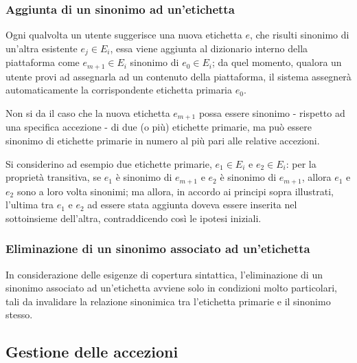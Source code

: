 \documentclass[10pt,a4paper,headinclude,footinclude,hidelinks]{scrreprt} %
\begin{document}

	\subsubsection{Aggiunta di un sinonimo ad un'etichetta}
	Ogni qualvolta un utente suggerisce una nuova etichetta $e$, che risulti sinonimo di un'altra esistente $e_j \in E_i$, essa viene aggiunta al dizionario interno della piattaforma come $e_{m+1} \in E_i$ sinonimo di $e_0 \in E_i$; da quel momento, qualora un utente provi ad assegnarla ad un contenuto della piattaforma, il sistema assegnerà automaticamente la corrispondente etichetta primaria $e_0$.

	Non si da il caso che la nuova etichetta $e_{m+1}$ possa essere sinonimo - rispetto ad una specifica accezione - di due (o più) etichette primarie, ma può essere sinonimo di etichette primarie in numero al più pari alle relative accezioni.

	Si considerino ad esempio due etichette primarie, $e_1 \in E_i$ e $e_2 \in E_i$: per la proprietà transitiva, se $e_1$ è sinonimo di $e_{m+1}$ e $e_2$ è sinonimo di $e_{m+1}$, allora $e_1$ e $e_2$ sono a loro volta sinonimi; ma allora, in accordo ai principi sopra illustrati, l'ultima tra $e_1$ e $e_2$ ad essere stata aggiunta doveva essere inserita nel sottoinsieme dell'altra, contraddicendo così le ipotesi iniziali.

	\subsubsection{Eliminazione di un sinonimo associato ad un'etichetta}
	In considerazione delle esigenze di copertura sintattica, l'eliminazione di un sinonimo associato ad un'etichetta avviene solo in condizioni molto particolari, tali da invalidare la relazione sinonimica tra l'etichetta primarie e il sinonimo stesso.

	\subsection{Gestione delle accezioni}
\end{document}
